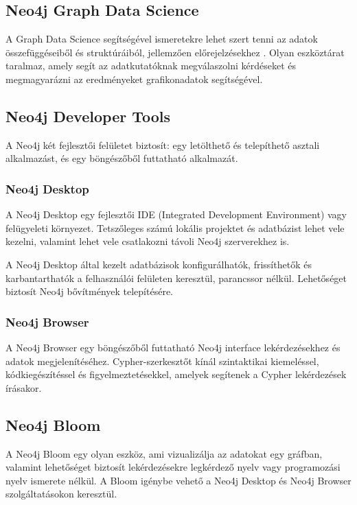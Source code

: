 \subsection{Neo4j Graph Data Science}
A Graph Data Science segítségével ismeretekre lehet szert tenni az adatok összefüggéseiből és struktúráiból, jellemzően előrejelzésekhez . Olyan eszköztárat taralmaz, amely segít az adatkutatóknak megválaszolni kérdéseket és megmagyarázni az eredményeket grafikonadatok segítségével. \cite{neo4j-graph-data-science}

\subsection{Neo4j Developer Tools}
A Neo4j két fejlesztői felületet biztosít: egy letölthető és telepíthető asztali alkalmazást, és egy böngészőből futtatható alkalmazát.

\subsubsection{Neo4j Desktop}
A Neo4j Desktop egy fejlesztői IDE (Integrated Development Environment) vagy felügyeleti környezet. \cite{neo4j-desktop}
Tetszőleges számú lokális projektet és adatbázist lehet vele kezelni, valamint lehet vele csatlakozni távoli Neo4j szerverekhez is. 

A Neo4j Desktop által kezelt adatbázisok konfigurálhatók, frissíthetők és karbantarthatók a felhasználói felületen keresztül, parancssor nélkül. Lehetőséget biztosít Neo4j bővítmények telepítésére.

\subsubsection{Neo4j Browser}
A Neo4j Browser egy böngészőből futtatható Neo4j interface lekérdezésekhez és adatok megjelenítéséhez. Cypher-szerkesztőt kínál szintaktikai kiemeléssel, kódkiegészítéssel és figyelmeztetésekkel, amelyek segítenek a Cypher lekérdezések írásakor.  \cite{neo4j-browser}

\subsection{Neo4j Bloom}
A Neo4j Bloom egy olyan eszköz, ami vizualizálja az adatokat egy gráfban, valamint lehetőséget biztosít lekérdezésekre legkérdező nyelv vagy programozási nyelv ismerete nélkül. A Bloom igénybe vehető a Neo4j Desktop és Neo4j Browser szolgáltatásokon keresztül. \cite{neo4j-bloom1} \cite{neo4j-bloom2}

